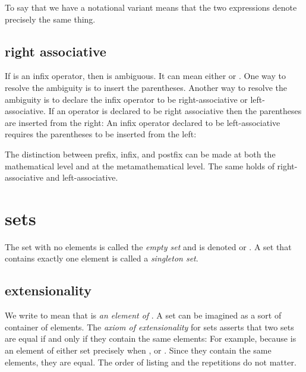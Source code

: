 \documentclass[cup9a]{cupbook}
\begin{document}
To say that we have a notational variant means that the two expressions denote precisely the same thing.  


\subsection{right associative}

If \mc{$*$} is an infix operator, then  is ambiguous.  It can mean
either  or .  One way to resolve the ambiguity is to insert the parentheses.  Another way to resolve the ambiguity is to declare the infix operator to  be right-associative or left-associative.  If an operator is
declared to be right associative then the parentheses are inserted from the right:
An infix operator declared to be left-associative requires the parentheses to be inserted from the left:

The distinction between prefix, infix, and postfix can be made at both the mathematical level and at the metamathematical level.  The same holds of right-associative and left-associative.



\section{sets}

The set with no elements is called the {\it empty set} and is denoted \mc{$\emptyset$} or \mc{$\{\}$}.
A set  that contains exactly one element  is called a {\it singleton set}. 

\subsection{extensionality}

We write  to mean that  is {\it an element of} .  A set can be imagined as a sort of container of elements.  The {\it axiom of extensionality} for sets asserts that two sets are equal if and only if they contain the same elements:
For example,
because  is an element of either set precisely when , or .
Since they contain the same elements, they are equal.  The order of listing and the repetitions do not matter.
\end{document}
